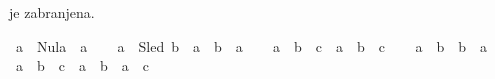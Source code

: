 \begin{isabellebody}
\begin{exercise}[subtitle=Dodatni primeri.]
\begin{isamarkuptext}
      je zabranjena.%
\end{isamarkuptext}\isamarkuptrue%
\isamarkupfalse%
\ {\isachardoublequoteopen}a\ {\isasymoplus}\ Nula\ {\isacharequal}{\kern0pt}\ a{\isachardoublequoteclose}\isanewline
\ \ %
\isadelimproof
%
\endisadelimproof
%
\isatagproof
%
\endisatagproof
{\isafoldproof}%
%
\isadelimproof
%
\endisadelimproof
\isanewline
{}\isamarkupfalse%
\ {\isachardoublequoteopen}a\ {\isasymotimes}\ {\isacharparenleft}{\kern0pt}Sled\ b{\isacharparenright}{\kern0pt}\ {\isacharequal}{\kern0pt}\ a\ {\isasymotimes}\ b\ {\isasymoplus}\ a{\isachardoublequoteclose}\isanewline
\ \ %
\isadelimproof
%
\endisadelimproof
%
\isatagproof
%
\endisatagproof
{\isafoldproof}%
%
\isadelimproof
%
\endisadelimproof
\isanewline
{}\isamarkupfalse%
\ {\isachardoublequoteopen}a\ {\isasymotimes}\ b\ {\isasymotimes}\ c\ {\isacharequal}{\kern0pt}\ a\ {\isasymotimes}\ {\isacharparenleft}{\kern0pt}b\ {\isasymotimes}\ c{\isacharparenright}{\kern0pt}{\isachardoublequoteclose}\isanewline
\ \ %
\isadelimproof
%
\endisadelimproof
%
\isatagproof
%
\endisatagproof
{\isafoldproof}%
%
\isadelimproof
%
\endisadelimproof
\isanewline
{}\isamarkupfalse%
\ {\isachardoublequoteopen}a\ {\isasymotimes}\ b\ {\isacharequal}{\kern0pt}\ b\ {\isasymotimes}\ a{\isachardoublequoteclose}\isanewline
\ \ %
\isadelimproof
%
\endisadelimproof
%
\isatagproof
%
\endisatagproof
{\isafoldproof}%
%
\isadelimproof
%
\endisadelimproof
\isanewline
{}\isamarkupfalse%
\ {\isachardoublequoteopen}a\ {\isasymotimes}\ {\isacharparenleft}{\kern0pt}b\ {\isasymoplus}\ c{\isacharparenright}{\kern0pt}\ {\isacharequal}{\kern0pt}\ a\ {\isasymotimes}\ b\ {\isasymoplus}\ a\ {\isasymotimes}\ c{\isachardoublequoteclose}\isanewline
\ \ %
\isadelimproof
%
\endisadelimproof
%
\isatagproof
%
\endisatagproof
{\isafoldproof}%
%
\isadelimproof
%
\endisadelimproof
%
\end{exercise}
%
\isadelimtheory
%
\endisadelimtheory
%
\isatagtheory
%
\endisatagtheory
{\isafoldtheory}%
%
\isadelimtheory
%
\endisadelimtheory
%
\end{isabellebody}%
\endinput
